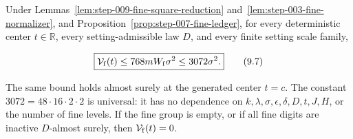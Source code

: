 \begin{proposition}\label{prop:step-009-count-free-fine-bound}
Under Lemmas~\ref{lem:step-009-fine-square-reduction}
and~\ref{lem:step-003-fine-normalizer}, and
Proposition~\ref{prop:step-007-fine-ledger}, for every
deterministic center \(t\in\mathbb R\), every setting-admissible law \(D\),
and every finite setting scale family,

\[
\boxed{
\mathcal V_{\rm f}(t)
\leq768mW_{\rm f}\sigma^2
\leq3072\sigma^2.
}
\tag{9.7}
\]

The same bound holds almost surely at the generated center \(t=c\). The
constant \(3072=48\cdot16\cdot2\cdot2\) is universal: it has no dependence
on \(k,\lambda,\sigma,\epsilon,\delta,D,t,J,H\), or the number of fine
levels. If the fine group is empty, or if all fine digits are inactive
\(D\)-almost surely, then \(\mathcal V_{\rm f}(t)=0\).
\end{proposition}

